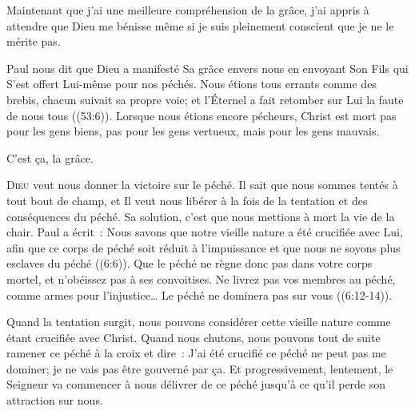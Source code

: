 
Maintenant que j'ai une meilleure compréhension de la grâce,
 j'ai appris à attendre que Dieu me bénisse même si je suis pleinement
 conscient que je ne le mérite pas.

Paul nous dit que Dieu a manifesté Sa grâce envers nous en envoyant Son Fils
 qui S'est offert Lui-même pour nos péchés.
 \og Nous étions tous errants comme des brebis, chacun suivait sa propre voie;
 et l'Éternel a fait retomber sur Lui la faute de nous tous \fg{}
 ((53:6)).
 Lorsque nous étions encore pécheurs, Christ est mort
 \ocadr pas pour les gens biens, pas pour les gens vertueux,
 mais pour les gens mauvais.

C'est ça,  la grâce.

\dvrule






\lettrine{D}{ieu} veut nous donner la victoire sur le péché.
 Il sait que nous sommes tentés à tout bout de champ,
 et Il veut nous libérer à la fois de la tentation et des conséquences
 du péché. Sa solution, c'est que nous mettions à mort la vie de la chair.
 Paul a écrit~: 
 \og Nous savons que notre vieille nature a été crucifiée avec Lui,
 afin que ce corps de péché soit réduit à l'impuissance
 et que nous ne soyons plus esclaves du péché \fg{} ((6:6)).
 \og Que le péché ne règne donc pas dans votre corps mortel,
 et n'obéissez pas à ses convoitises. Ne livrez pas vos membres au péché,
 comme armes pour l'injustice\dots{}
 Le péché ne dominera pas sur vous \fg{} ((6:12-14)).


Quand la tentation surgit, nous pouvons considérer cette vieille nature
 comme étant crucifiée avec Christ. Quand nous chutons, nous pouvons
 tout de suite ramener ce péché à la croix et dire~: 
 \og J'ai été crucifié \ocadr ce péché ne peut pas me dominer;
 je ne vais pas être gouverné par ça. \fg{}
 Et progressivement, lentement, le Seigneur va commencer à nous délivrer
 de ce péché jusqu'à ce qu'il perde son attraction sur nous.

